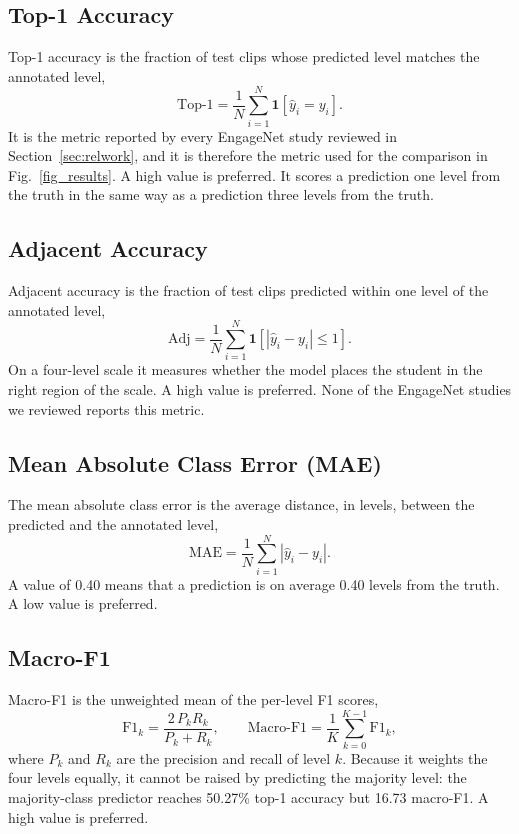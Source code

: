 \documentclass[journal]{IEEEtran}
\begin{document}
\subsection{Top-1 Accuracy}

Top-1 accuracy is the fraction of test clips whose predicted level matches the annotated level,
\begin{equation}
\mathrm{Top\text{-}1} = \frac{1}{N} \sum_{i=1}^{N} \mathbf{1}\!\left[\hat{y}_i = y_i\right].
\end{equation}
It is the metric reported by every EngageNet study reviewed in Section~\ref{sec:relwork}, and it is therefore the metric used for the comparison in Fig.~\ref{fig_results}. A high value is preferred. It scores a prediction one level from the truth in the same way as a prediction three levels from the truth.

\subsection{Adjacent Accuracy}

Adjacent accuracy is the fraction of test clips predicted within one level of the annotated level,
\begin{equation}
\mathrm{Adj} = \frac{1}{N} \sum_{i=1}^{N} \mathbf{1}\!\left[\left|\hat{y}_i - y_i\right| \leq 1\right].
\end{equation}
On a four-level scale it measures whether the model places the student in the right region of the scale. A high value is preferred. None of the EngageNet studies we reviewed reports this metric.

\subsection{Mean Absolute Class Error (MAE)}

The mean absolute class error is the average distance, in levels, between the predicted and the annotated level,
\begin{equation}
\mathrm{MAE} = \frac{1}{N} \sum_{i=1}^{N} \left|\hat{y}_i - y_i\right|.
\end{equation}
A value of 0.40 means that a prediction is on average 0.40 levels from the truth. A low value is preferred.

\subsection{Macro-F1}

Macro-F1 is the unweighted mean of the per-level F1 scores,
\begin{equation}
\mathrm{F1}_k = \frac{2\,P_k R_k}{P_k + R_k}, \qquad \mathrm{Macro\text{-}F1} = \frac{1}{K} \sum_{k=0}^{K-1} \mathrm{F1}_k,
\end{equation}
where $P_k$ and $R_k$ are the precision and recall of level $k$. Because it weights the four levels equally, it cannot be raised by predicting the majority level: the majority-class predictor reaches 50.27\% top-1 accuracy but 16.73 macro-F1. A high value is preferred.
\end{document}
